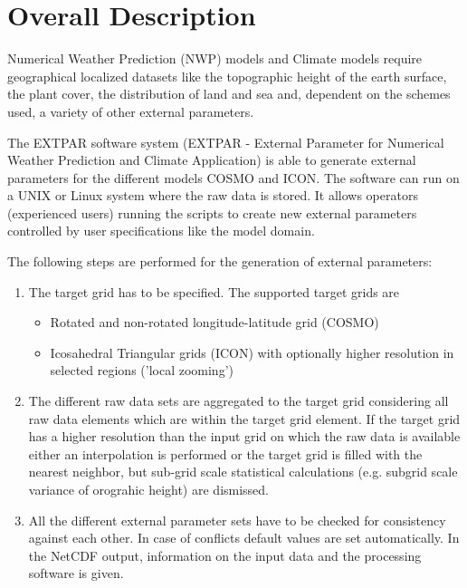 \documentclass[a4paper,10pt,DIV14,BCOR1cm,titlepage,twoside]{scrartcl}
\begin{document}
\section{Overall Description}
Numerical Weather Prediction (NWP) models and Climate models require geographical localized datasets like the topographic height of the earth surface, the plant cover, the distribution of land and sea and, dependent on the schemes used, a variety of other external parameters.\par\medskip\noindent
The EXTPAR software system (EXTPAR - External Parameter for Numerical Weather Prediction and Climate Application) is able to generate external parameters for the different models COSMO and ICON. The software can run on a UNIX or Linux system where the raw data is stored. It allows operators (experienced users) running the scripts to create new external parameters controlled by user specifications like the model domain.\par\medskip\noindent
The following steps are performed for the generation of external parameters: \begin{enumerate}
\item The target grid has to be specified. The supported target grids are \begin{itemize}
\item Rotated and non-rotated longitude-latitude grid (COSMO) \item Icosahedral Triangular grids (ICON) with optionally higher resolution in selected regions ('local zooming')  \end{itemize}
\item The different raw data sets are aggregated to the target grid considering all raw data elements which are within the target grid element. If the target grid has a higher resolution than the input grid on which the raw data is available either an interpolation is performed or the target grid is filled with the nearest neighbor, but sub-grid scale statistical calculations (e.g. subgrid scale variance of orograhic height) are dismissed.  \item All the different external parameter sets have to be checked for consistency against each other. In case of conflicts default values are set automatically. In the NetCDF output, information on the input data and the processing software is given.  \end{enumerate}
\end{document}
